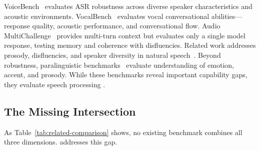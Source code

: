 VoiceBench~\cite{chen_voicebench_2024} evaluates ASR robustness across diverse speaker characteristics and acoustic environments. VocalBench~\cite{liu_vocalbench_2026} evaluates vocal conversational abilities—response quality, acoustic performance, and conversational flow. Audio MultiChallenge~\cite{gosai_audio_2025} provides multi-turn context but evaluates only a single model response, testing memory and coherence with disfluencies. Related work addresses prosody, disfluencies, and speaker diversity in natural speech~\cite{zhang_wildspeech-bench_2025, wang_audiobench_2025}. Beyond robustness, paralinguistic benchmarks~\cite{jiang_s2s-arena_2025, yang_paras2s_2025, ao_sd-eval_2025} evaluate understanding of emotion, accent, and prosody.  While these benchmarks reveal important capability gaps, they evaluate speech processing .

\subsection{The Missing Intersection}

As Table~\ref{tab:related-comparison} shows, no existing benchmark combines all three dimensions. \tauvoice{} addresses this gap.
